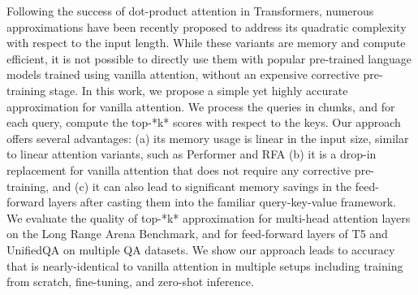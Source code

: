 Following the success of dot-product attention in Transformers, numerous approximations have been recently proposed to address its quadratic complexity with respect to the input length. While these variants are memory and compute efficient, it is not possible to directly use them with popular pre-trained language models trained using vanilla attention, without an expensive corrective pre-training stage. In this work, we propose a simple yet highly accurate approximation for vanilla attention. We process the queries in chunks, and for each query, compute the top-*k* scores with respect to the keys. Our approach offers several advantages: (a) its memory usage is linear in the input size, similar to linear attention variants, such as Performer and RFA (b) it is a drop-in replacement for vanilla attention that does not require any corrective pre-training, and (c) it can also lead to significant memory savings in the feed-forward layers after casting them into the familiar query-key-value framework. We evaluate the quality of top-*k* approximation for multi-head attention layers on the Long Range Arena Benchmark, and for feed-forward layers of T5 and UnifiedQA on multiple QA datasets. We show our approach leads to accuracy that is nearly-identical to vanilla attention in multiple setups including training from scratch, fine-tuning, and zero-shot inference.
